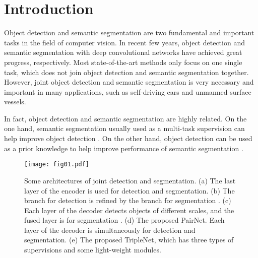 \documentclass[10pt,twocolumn,letterpaper]{article}
\begin{document}
\section{Introduction}
\label{secIntroduction}
Object detection and semantic segmentation are two fundamental and important tasks in the field of computer vision. In recent few years, object detection \cite{Ren_FasterRCNN_NIPS_2015,Liu_SSD_ECCV_2016,Lin_Focal_ICCV_2017} and semantic segmentation \cite{Long_FCN_CVPR_2015,Chen_Deeplab_PAMI_2017,Badrinarayanan_SegNet_PAMI_2017} with deep convolutional networks \cite{Krizhevsky_ImageNet_NIPS_2012,Simonyan_VGG_arXiv_2014,He_MaskRCNN_ICCV_2017,Huang_DenseNet_CVPR_2017} have achieved great progress, respectively. Most state-of-the-art methods only focus on one single task, which does not join object detection and semantic segmentation together. However, joint object detection and semantic segmentation is very necessary and important in many applications, such as self-driving cars and unmanned surface vessels.

In fact, object detection and semantic segmentation are highly related. On the one hand, semantic segmentation usually used as a multi-task supervision can help improve object detection \cite{Mao_Hyper_CVPR_2017,Lin_Graininess_ECCV_2018}. On the other hand, object detection can be used as a prior knowledge to help improve performance of semantic segmentation \cite{He_MaskRCNN_ICCV_2017,Pinheiro_ROS_ECCV_2016}. 

\begin{figure}
\begin{center}
\texttt{[image: fig01.pdf]}
\end{center}
\caption{Some architectures of joint detection and segmentation. (a) The last layer of the encoder is used for detection and segmentation\cite{Brazil_SDSRCNN_ICCV_2017}. (b) The branch for detection is refined by the branch for segmentation \cite{Mao_Hyper_CVPR_2017,Zhang_DES_CVPR_2018}. (c) Each layer of the decoder detects objects of different scales, and the fused layer is for segmentation \cite{Dvornik_Blitznet_ICCV_2017}. (d) The proposed PairNet. Each layer of the decoder is simultaneously for detection and segmentation. (e) The proposed TripleNet, which has three types of supervisions and some light-weight modules.}
\label{fig01}
\end{figure}
\end{document}
